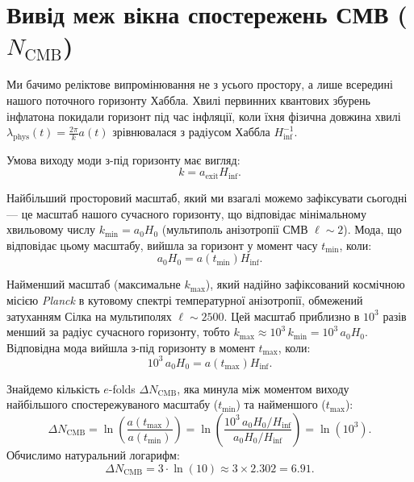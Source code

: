 \section{Вивід меж вікна спостережень СМВ ($N_{\mathrm{CMB}}$)}

Ми бачимо реліктове випромінювання не з усього простору, а лише всередині нашого поточного горизонту Хаббла. Хвилі первинних квантових збурень інфлатона покидали горизонт під час інфляції, коли їхня фізична довжина хвилі $\lambda_{\mathrm{phys}}(t) = \frac{2\pi}{k} a(t)$ зрівнювалася з радіусом Хаббла $H_{\mathrm{inf}}^{-1}$.

Умова виходу моди з-під горизонту має вигляд:
\begin{equation}
\label{eq:app_exit}
k = a_{\mathrm{exit}} H_{\mathrm{inf}}.
\end{equation}

Найбільший просторовий масштаб, який ми взагалі можемо зафіксувати сьогодні --- це масштаб нашого сучасного горизонту, що відповідає мінімальному хвильовому числу $k_{\mathrm{min}} = a_0 H_0$ (мультиполь анізотропії СМВ $\ell \sim 2$). Мода, що відповідає цьому масштабу, вийшла за горизонт у момент часу $t_{\mathrm{min}}$, коли:
\begin{equation}
a_0 H_0 = a(t_{\mathrm{min}}) H_{\mathrm{inf}}.
\end{equation}

Найменший масштаб (максимальне $k_{\mathrm{max}}$), який надійно зафіксований космічною місією \emph{Planck} в кутовому спектрі температурної анізотропії, обмежений затуханням Сілка на мультиполях $\ell \sim 2500$. Цей масштаб приблизно в $10^3$ разів менший за радіус сучасного горизонту, тобто $k_{\mathrm{max}} \approx 10^3 \, k_{\mathrm{min}} = 10^3 \, a_0 H_0$. Відповідна мода вийшла з-під горизонту в момент $t_{\mathrm{max}}$, коли:
\begin{equation}
10^3 \, a_0 H_0 = a(t_{\mathrm{max}}) H_{\mathrm{inf}}.
\end{equation}

Знайдемо кількість $e$-folds $\Delta N_{\mathrm{CMB}}$, яка минула між моментом виходу найбільшого спостережуваного масштабу ($t_{\mathrm{min}}$) та найменшого ($t_{\mathrm{max}}$):
\begin{equation}
\Delta N_{\mathrm{CMB}} = \ln \left( \frac{a(t_{\mathrm{max}})}{a(t_{\mathrm{min}})} \right) = \ln \left( \frac{10^3 \, a_0 H_0 / H_{\mathrm{inf}}}{a_0 H_0 / H_{\mathrm{inf}}} \right) = \ln(10^3).
\end{equation}
Обчислимо натуральний логарифм:
\begin{equation}
\Delta N_{\mathrm{CMB}} = 3 \cdot \ln(10) \approx 3 \times 2.302 = \mathbf{6.91}.
\end{equation}

